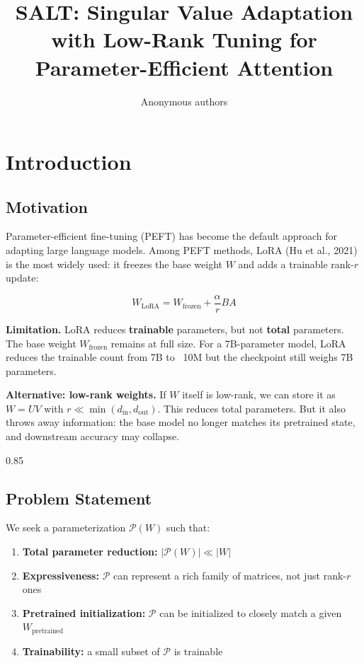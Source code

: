 \title{\textbf{SALT: Singular Value Adaptation with Low-Rank Tuning for Parameter-Efficient Attention}}

\author{Anonymous authors}



\section{Introduction}

\subsection{Motivation}

Parameter-efficient fine-tuning (PEFT) has become the default approach for 
adapting large language models. Among PEFT methods, LoRA (Hu et al., 2021) 
is the most widely used: it freezes the base weight $W$ and adds a trainable 
rank-$r$ update:

\[
W_\text{LoRA} = W_\text{frozen} + \frac{\alpha}{r} B A
\tag{1.1}
\]

\textbf{Limitation.} LoRA reduces \textbf{trainable} parameters, but not \textbf{total} 
parameters. The base weight $W_\text{frozen}$ remains at full size. For a 
7B-parameter model, LoRA reduces the trainable count from 7B to ~10M but 
the checkpoint still weighs 7B parameters.

\textbf{Alternative: low-rank weights.} If $W$ itself is low-rank, we can store 
it as $W = U V$ with $r \ll \min(d_\text{in}, d_\text{out})$. This reduces 
total parameters. But it also throws away information: the base model no 
longer matches its pretrained state, and downstream accuracy may collapse.

0.85


\subsection{Problem Statement}

We seek a parameterization $\mathcal{P}(W)$ such that:

\begin{enumerate}
\item \textbf{Total parameter reduction:} $|\mathcal{P}(W)| \ll |W|$
\item \textbf{Expressiveness:} $\mathcal{P}$ can represent a rich family of matrices,
  not just rank-$r$ ones
\item \textbf{Pretrained initialization:} $\mathcal{P}$ can be initialized to closely
  match a given $W_\text{pretrained}$
\item \textbf{Trainability:} a small subset of $\mathcal{P}$ is trainable

\end{enumerate}
